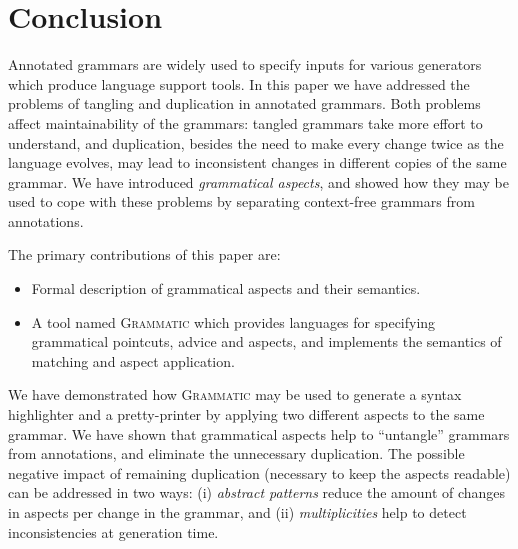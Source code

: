 \documentclass{IOS-Book-Article}     %
\newcommand{\tool}[1]{\textsc{#1}}
\newcommand{\Grammatic}[0]{\tool{Grammatic}}
\begin{document}
%
%
%
%
\section{Conclusion}\label{Conclusion}

Annotated grammars are widely used to specify inputs for various generators which produce language support tools.
In this paper we have addressed the problems of tangling and duplication in annotated grammars. Both problems affect maintainability of the grammars: tangled grammars take more effort to understand, and duplication, besides the need to make every change twice as the language evolves, may lead to inconsistent changes in different copies of the same grammar.
We have introduced \emph{grammatical aspects}, and showed how they may be used to cope with these problems by separating context-free grammars from annotations. 

The primary contributions of this paper are:
\begin{itemize} 
	\item Formal description of grammatical aspects and their semantics.
	\item A tool named \Grammatic{} which provides languages for specifying grammatical pointcuts, advice and aspects, and implements the semantics of matching and aspect application.
\end{itemize}

We have demonstrated how \Grammatic{} may be used to generate a syntax highlighter and a pretty-printer by applying two different aspects to the same grammar. We have shown that grammatical aspects help to ``untangle'' grammars from annotations, and eliminate the unnecessary duplication. The possible negative impact of remaining duplication (necessary to keep the aspects readable) can be addressed in two ways:
	(i) \emph{abstract patterns} reduce the amount of changes in aspects per change in the grammar, and
	(ii) \emph{multiplicities} help to detect inconsistencies at generation time.
\end{document}
